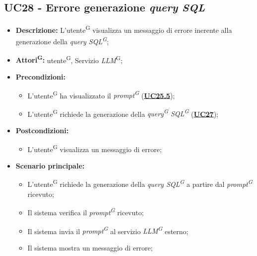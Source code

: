 \subsection{UC28 - Errore generazione \textit{query SQL}}
\label{sec:UC28}
\begin{itemize}
	\item \textbf{Descrizione:} L'utente\textsuperscript{G} visualizza un messaggio di errore inerente alla generazione della \textit{query SQL\textsuperscript{G}};
	\item \textbf{Attori\textsuperscript{G}:} utente\textsuperscript{G}, Servizio \textit{LLM}\textsuperscript{G};
	\item \textbf{Precondizioni:} 
	\begin{itemize}
		\item L'utente\textsuperscript{G} ha visualizzato il \textit{prompt\textsuperscript{G}} (\hyperref[sec:UC25.5]{\textbf{UC25.5}});
		\item L'utente\textsuperscript{G} richiede la generazione della \textit{query\textsuperscript{G} SQL\textsuperscript{G}} (\hyperref[sec:UC27]{\textbf{UC27}});
	\end{itemize}
	\item \textbf{Postcondizioni:} 
	\begin{itemize}
		\item L'utente\textsuperscript{G} visualizza un messaggio di errore;
	\end{itemize}
	\item \textbf{Scenario principale:}
	\begin{itemize}
		\item L'utente\textsuperscript{G} richiede la generazione della \textit{query SQL\textsuperscript{G}} a partire dal \textit{prompt\textsuperscript{G}} ricevuto;
		\item Il sistema verifica il \textit{prompt\textsuperscript{G}} ricevuto;
		\item Il sistema invia il \textit{prompt\textsuperscript{G}} al servizio \textit{LLM\textsuperscript{G}} esterno;
		\item Il sistema mostra un messaggio di errore;
	\end{itemize}
\end{itemize}

